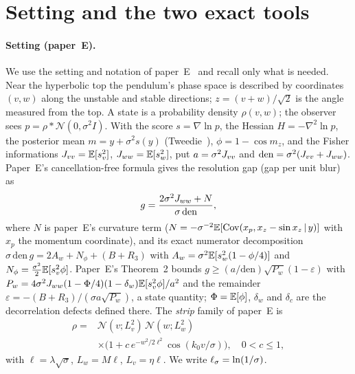 \section{Setting and the two exact tools}
\label{sec:setting}

\paragraph*{Setting (paper~E).}
We use the setting and notation of paper~E~\cite{paperE} and recall only what is needed. Near the hyperbolic top the pendulum's phase
space is described by coordinates $(v,w)$ along the unstable and stable directions; $z=(v+w)/\sqrt2$ is the angle measured from the top.
A state is a probability density $\rho(v,w)$; the observer sees $p=\rho*\mathcal N(0,\sigma^2I)$. With the score $s=\nabla\ln p$, the
Hessian $H=-\nabla^2\ln p$, the posterior mean $m=y+\sigma^2s(y)$ (Tweedie~\cite{Efron2011}), $\phi=1-\cos m_z$, and the Fisher informations
$J_{vv}=\mathbb{E}[s_v^2]$, $J_{ww}=\mathbb{E}[s_w^2]$, put $a=\sigma^2J_{vv}$ and $\mathrm{den}=\sigma^2(J_{vv}+J_{ww})$. Paper~E's cancellation-free formula gives the
resolution gap (gap per unit blur) as
\begin{equation}
g=\frac{2\sigma^2J_{ww}+N}{\sigma\,\mathrm{den}},
\label{eq:gap}
\end{equation}
where $N$ is paper~E's curvature term ($N=-\sigma^{-2}\mathbb{E}[\mathrm{Cov}(x_p,x_z-\sin x_z\,|\,y)]$ with $x_p$ the momentum coordinate), and its exact numerator decomposition $\sigma\,\mathrm{den}\,g=2A_w+N_\phi+(B+R_3)$ with $A_w=\sigma^2\mathbb{E}[s_w^2(1-\phi/4)]$ and
$N_\phi=\tfrac{\sigma^2}{2}\mathbb{E}[s_v^2\phi]$. Paper~E's Theorem~2 bounds $g\ge(a/\mathrm{den})\sqrt{P_w}(1-\varepsilon)$ with
$P_w=4\sigma^2J_{ww}(1-\Phi/4)(1-\delta_w)\mathbb{E}[s_v^2\phi]/a^2$ and the remainder $\varepsilon=-(B+R_3)/(\sigma a\sqrt{P_w})$, a state quantity;
$\Phi=\mathbb{E}[\phi]$, $\delta_w$ and $\delta_c$ are the decorrelation defects defined there. The \emph{strip} family of paper~E is
\begin{equation}
\begin{aligned}\rho={}&\mathcal N(v;L_v^2)\,\mathcal N(w;L_w^2)\\&\times\big(1+c\,e^{-w^2/2\ell^2}\cos(k_0v/\sigma)\big),\quad 0<c\le1,\end{aligned}
\label{eq:strip}
\end{equation}
with $\ell=\lambda\sqrt\sigma$, $L_w=M\ell$, $L_v=\eta\ell$. We write $\ell_\sigma=\ln(1/\sigma)$.

